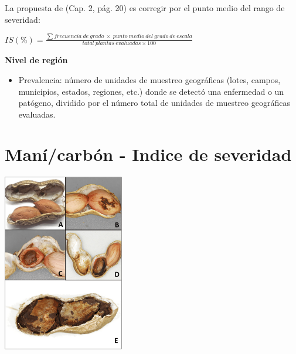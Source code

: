 \documentclass[]{book}
\newenvironment{Shaded}{\begin{snugshade}}{\end{snugshade}}
\newcommand{\KeywordTok}[1]{\textcolor[rgb]{0.13,0.29,0.53}{\textbf{#1}}}
\newcommand{\NormalTok}[1]{#1}
\newcommand{\OperatorTok}[1]{\textcolor[rgb]{0.81,0.36,0.00}{\textbf{#1}}}
\newcommand{\StringTok}[1]{\textcolor[rgb]{0.31,0.60,0.02}{#1}}
\providecommand{\tightlist}{%
  \setlength{\itemsep}{0pt}\setlength{\parskip}{0pt}}
\begin{document}
La propuesta de \citet{madden2007study} (Cap. 2, pág. 20) es corregir
por el punto medio del rango de severidad:

\(IS(\%)=\frac {\sum frecuencia \: de \: grado\: \times\: punto \: medio \: del \: grado \:de\: escala} {total \: plantas \: evaluadas \times 100}\)

\textbf{Nivel de región}

\begin{itemize}
\tightlist
\item
  Prevalencia: número de unidades de muestreo geográficas (lotes,
  campos, municipios, estados, regiones, etc.) donde se detectó una
  enfermedad o un patógeno, dividido por el número total de unidades de
  muestreo geográficas evaluadas.
\end{itemize}

\hypertarget{manuxedcarbuxf3n---indice-de-severidad}{%
\chapter{Maní/carbón - Indice de
severidad}\label{manuxedcarbuxf3n---indice-de-severidad}}

\includegraphics[width=2.08333in,height=\textheight]{fig/peanut_smut.png}

\begin{Shaded}
\end{Shaded}
\end{document}
